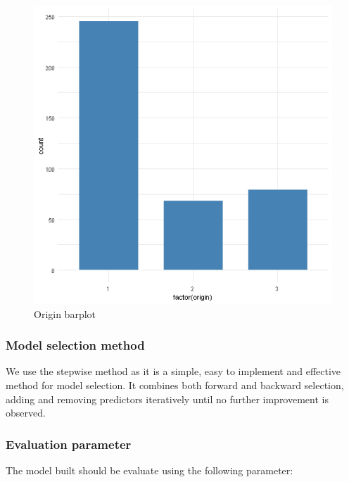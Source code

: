 \begin{itemize}
\begin{figure}[H]
\centering
\includegraphics[scale=0.4]{img/originbarplot.png}
\caption{Origin barplot}
\label{fig:origin_barplot}
\end{figure}


\end{itemize}

\subsubsection{Model selection method}

We use the stepwise method as it is a simple, easy to implement and effective method for model selection. It combines both forward and backward selection, adding and removing predictors iteratively until no further improvement is observed.

\subsubsection{Evaluation parameter}

The model built should be evaluate using the following parameter:

